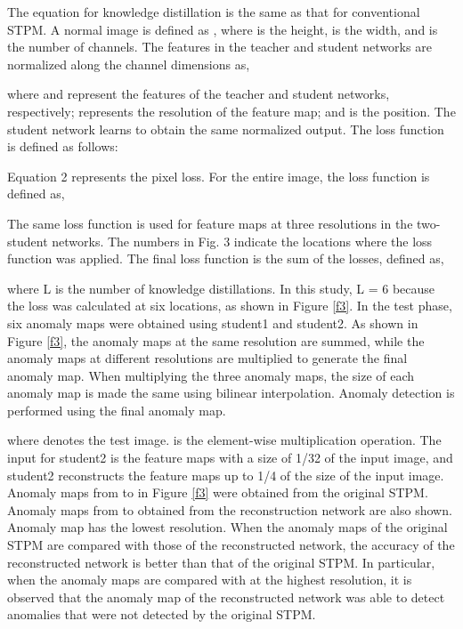 \documentclass[letterpaper, 10 pt, conference]{ieeeconf}
\begin{document}
The equation for knowledge distillation is the same as that for conventional STPM. A normal image is defined as , where  is the height,  is the width, and  is the number of channels. The features in the teacher and student networks are normalized along the channel dimensions as,

where  and  represent the features of the teacher and student networks, respectively;  represents the resolution of the feature map; and  is the position. The student network learns to obtain the same normalized output. The loss function is defined as follows:


Equation 2 represents the pixel loss. For the entire image, the loss function is defined as,


The same loss function is used for feature maps at three resolutions in the two-student networks. The numbers in Fig. 3 indicate the locations where the loss function was applied. The final loss function is the sum of the losses, defined as,



where L is the number of knowledge distillations. In this study, L = 6 because the loss was calculated at six locations, as shown in Figure \ref{f3}. In the test phase, six anomaly maps  were obtained using student1 and student2. As shown in Figure \ref{f3}, the anomaly maps at the same resolution are summed, while the anomaly maps at different resolutions are multiplied to generate the final anomaly map. When multiplying the three anomaly maps, the size of each anomaly map is made the same using bilinear interpolation. Anomaly detection is performed using the final anomaly map.


where  denotes the test image.  is the element-wise multiplication operation. The input for student2 is the feature maps with a size of 1/32 of the input image, and student2 reconstructs the feature maps up to 1/4 of the size of the input image. Anomaly maps from  to  in Figure \ref{f3} were obtained from the original STPM. Anomaly maps from  to  obtained from the reconstruction network are also shown. Anomaly map  has the lowest resolution. When the anomaly maps of the original STPM are compared with those of the reconstructed network, the accuracy of the reconstructed network is better than that of the original STPM. In particular, when the anomaly maps  are compared with  at the highest resolution, it is observed that the anomaly map  of the reconstructed network was able to detect anomalies that were not detected by the original STPM. 
\end{document}
